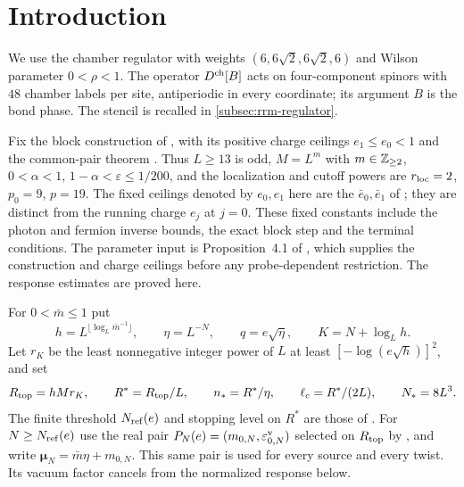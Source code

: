 \section{Introduction}\label{sec:rrm-introduction}

We use the chamber regulator with weights $(6,6\sqrt2,6\sqrt2,6)$
and Wilson parameter $0<\rho<1$. The operator $D^{\rm ch}[B]$
acts on four-component spinors with $48$ chamber labels per site,
antiperiodic in every coordinate; its argument $B$ is the bond phase.
The stencil is recalled in \cref{subsec:rrm-regulator}.

Fix the block construction of \cite[Proposition~4.1 and \S4.1--4.4]{QED3Integration},
with its positive charge ceilings $e_1\le e_0<1$ and the
common-pair theorem \cite[Theorem~D]{CoverTuning}.
Thus $L\ge13$ is odd, $M=L^m$ with $m\in\mathbb Z_{\ge2}$,
$0<\alpha<1$, $1-\alpha<\varepsilon\le1/200$, and the localization and cutoff
powers are $r_{\rm loc}=2$, $p_0=9$, $p=19$.
The fixed ceilings denoted by $e_0,e_1$ here are the
$\bar e_0,\bar e_1$ of \cite{QED3Integration};
they are distinct from the running charge $e_j$ at $j=0$.
These fixed constants include the photon and fermion inverse bounds,
the exact block step and the terminal conditions. The parameter input is Proposition~4.1 of \cite{QED3Integration},
which supplies the construction and charge ceilings before any
probe-dependent restriction. The response estimates are proved here.

For $0<\bar m\le1$ put
\[
 h=L^{\lfloor\log_L\bar m^{-1}\rfloor},\qquad
 \eta=L^{-N},\qquad q=e\sqrt\eta,\qquad K=N+\log_Lh.
\]
Let $r_K$ be the least nonnegative integer power of $L$ at least
$[-\log(e\sqrt h)]^2$, and set
\[
 R_{\rm top}=hMr_K,\qquad R^*=R_{\rm top}/L,\qquad
 n_*=R^*/\eta,\qquad \ell_c=R^*/(2L),\qquad N_*=8L^3.
\]
The finite threshold $N_{\rm ref}(e)$ and stopping level on $R^*$
are those of \cite[Proposition~6.1 and (53)]{CoverTuning}.
For $N\ge N_{\rm ref}(e)$ use the real pair
$P_N(e)=(m_{0,N},\varepsilon_{0,N}^{\rm v})$ selected on
$R_{\rm top}$ by \cite[Theorem~D]{CoverTuning}, and write
$\boldsymbol\mu_N=\bar m\eta+m_{0,N}$.
This same pair is used for every source and every twist.
Its vacuum factor cancels from the normalized response below.

